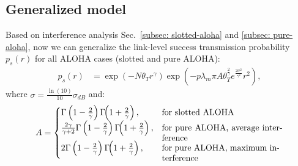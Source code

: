 \subsection{Generalized model}
Based on interference analysis Sec.~\ref{subsec: slotted-aloha} and \ref{subsec: pure-aloha}, now we can generalize the link-level success transmission probability $p_s(r)$ for all ALOHA cases (slotted and pure ALOHA):
\begin{align}
\label{eq:def_ps_2}
p_{s}(r) & = \exp(-N \theta_{T}  r^{\gamma} ) \exp(-p \lambda_{m} \pi A \theta_{T}^{\frac{2}{\gamma}} e^{\frac{2\sigma^2}{\gamma^2}}  r^2 ),
\end{align}
where $\sigma = \frac{\ln(10)}{10}\sigma_{dB}$ and:
\[ A =
\begin{cases} 
\Gamma\left( 1-\frac{2}{\gamma}\right)\Gamma\!\!\left( 1+\frac{2}{\gamma}\right) ,  & \text{for slotted ALOHA }\\
\frac{2\gamma}{\gamma+2}\Gamma \left( 1-\frac{2}{\gamma}\right)\Gamma\!\!\left( 1+\frac{2}{\gamma}\right),  & \parbox[t]{.41\columnwidth}{for pure ALOHA, average interference }\\
2\Gamma \left( 1-\frac{2}{\gamma}\right)\Gamma\!\!\left( 1+\frac{2}{\gamma}\right),  & \parbox[t]{.4\columnwidth}{for pure ALOHA, maximum interference }
\end{cases}
\]


%
